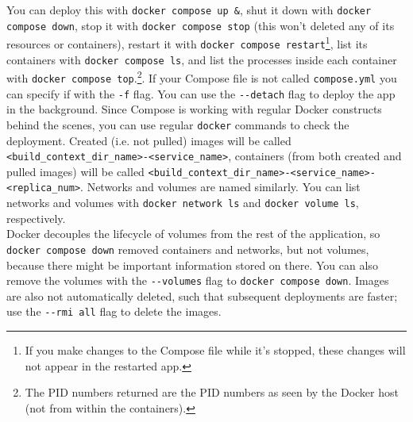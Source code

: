 \documentclass[8pt, table, xcdraw]{article}%
\begin{document}
You can deploy this with \lstinline{docker compose up &}, shut it down with \lstinline{docker compose down}, stop it with \lstinline{docker compose stop} (this won't deleted any of its resources or containers), restart it with \lstinline{docker compose restart}\footnote{If you make changes to the Compose file while it’s stopped, these changes will not appear in the restarted app.}, list its containers with \lstinline{docker compose ls}, and list the processes inside each container with \lstinline{docker compose top}.\footnote{The PID numbers returned are the PID numbers as seen by the Docker host (not from within the containers).}. If your Compose file is not called \lstinline{compose.yml} you can specify if with the \lstinline{-f} flag. You can use the \lstinline{--detach} flag to deploy the app in the background. Since Compose is working with regular Docker constructs behind the scenes, you can use regular \lstinline{docker} commands to check the deployment. Created (i.e. not pulled) images will be called \lstinline{<build_context_dir_name>-<service_name>}, containers (from both created and pulled images) will be called \lstinline{<build_context_dir_name>-<service_name>-<replica_num>}. Networks and volumes are named similarly. You can list networks and volumes with \lstinline{docker network ls} and \lstinline{docker volume ls}, respectively.\\
Docker decouples the lifecycle of volumes from the rest of the application, so \lstinline{docker compose down} removed containers and networks, but not volumes, because there might be important information stored on there. You can also remove the volumes with the \lstinline{--volumes} flag to \lstinline{docker compose down}. Images are also not automatically deleted, such that subsequent deployments are faster; use the \lstinline{--rmi all} flag to delete the images.
\end{document}

